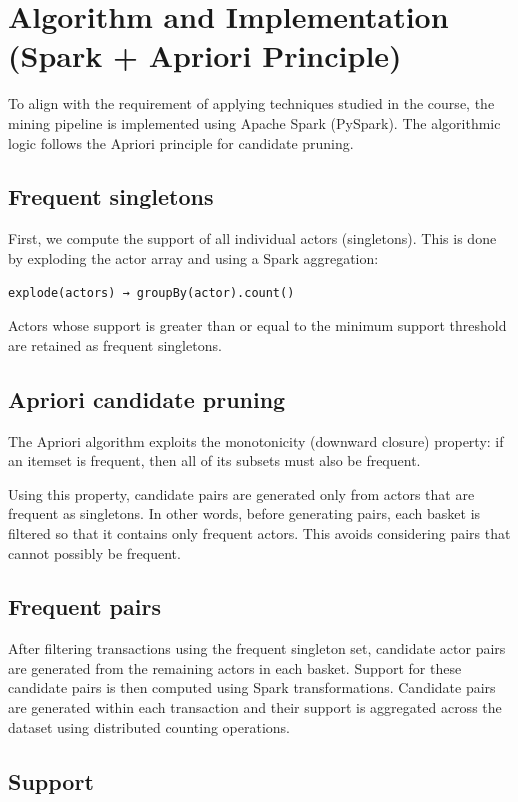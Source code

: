 \documentclass[11pt,a4paper]{article}
\begin{document}
\section{Algorithm and Implementation (Spark + Apriori Principle)}

To align with the requirement of applying techniques studied in the course, the mining pipeline is implemented using Apache Spark (PySpark). The algorithmic logic follows the Apriori principle for candidate pruning.

\subsection{Frequent singletons}

First, we compute the support of all individual actors (singletons). This is done by exploding the actor array and using a Spark aggregation:

\texttt{explode(actors) → groupBy(actor).count()}

Actors whose support is greater than or equal to the minimum support threshold are retained as frequent singletons.

\subsection{Apriori candidate pruning}

The Apriori algorithm exploits the monotonicity (downward closure) property: if an itemset is frequent, then all of its subsets must also be frequent.

Using this property, candidate pairs are generated only from actors that are frequent as singletons. In other words, before generating pairs, each basket is filtered so that it contains only frequent actors. This avoids considering pairs that cannot possibly be frequent.

\subsection{Frequent pairs}

After filtering transactions using the frequent singleton set, candidate actor pairs are generated from the remaining actors in each basket. Support for these candidate pairs is then computed using Spark transformations. Candidate pairs are generated within each transaction and their support is aggregated across the dataset using distributed counting operations.

\subsection{Support}
\end{document}
